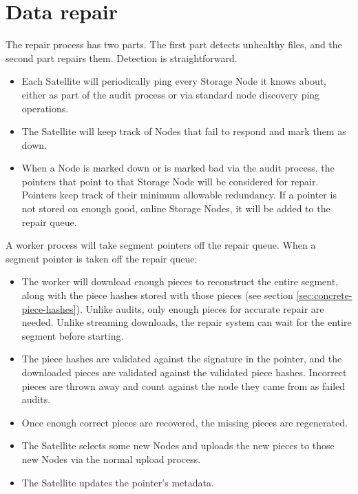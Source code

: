 \documentclass[8pt,fleqn,openany]{book}
\begin{document}
\section{Data repair}

The repair process has two parts. The first part detects unhealthy files, and
the second part repairs them. Detection is straightforward.

\begin{itemize}
\item Each Satellite will periodically ping every Storage Node it knows
about, either as part of the audit process or via standard node discovery ping operations.
\item The Satellite will keep track of Nodes that fail to respond and mark
  them as down.
\item When a Node is marked down or is marked bad via the audit process, the
  pointers that point to that Storage Node will be considered for repair.
  Pointers
  keep track of their minimum allowable redundancy. If a pointer is not stored
  on enough good, online Storage Nodes, it will be added to the repair queue.
\end{itemize}

A worker process will take segment pointers off the repair queue.
When a segment pointer is taken off the repair queue:

\begin{itemize}
\item The worker will download enough pieces to reconstruct the entire segment,
  along with the piece hashes stored with those pieces
  (see section \ref{sec:concrete-piece-hashes}).
  Unlike audits, only enough pieces for accurate repair are needed.
  Unlike streaming downloads, the repair system can wait for the entire segment
  before starting.
\item The piece hashes are validated against the signature in the pointer,
  and the downloaded pieces are validated against the validated piece hashes.
  Incorrect pieces are thrown away and count against the node they came from
  as failed audits.
\item Once enough correct pieces are recovered, the missing pieces are
  regenerated.
\item The Satellite selects some new Nodes and uploads the new pieces to
  those new Nodes via the normal upload process.
\item The Satellite updates the pointer's metadata.
\end{itemize}
\end{document}
